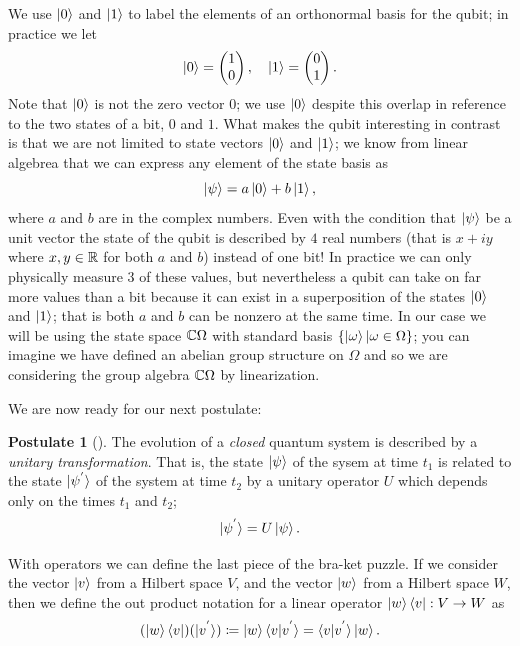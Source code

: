 \documentclass[12pt,twoside]{reedthesis}
\theoremstyle{plain}   %
\theoremstyle{definition}
\newtheorem{post}{Postulate}[section]
\theoremstyle{remark}
\numberwithin{equation}{section}
\begin{document}
   We use $\ket{0}$ and $\ket{1}$ to label the elements of an orthonormal basis for the qubit; in practice we let
   \[\ket{0} =
     \begin{pmatrix}
       1 \\
       0
     \end{pmatrix},
     \quad
     \ket{1} =
     \begin{pmatrix}
       0 \\
       1
     \end{pmatrix}.
   \]
   Note that $\ket{0}$ is not the zero vector $0$; we use $\ket{0}$ despite this overlap in reference to the two states of a bit, $0$ and $1$.
   What makes the qubit interesting in contrast is that we are not limited to state vectors $\ket{0}$ and $\ket{1}$; we know from linear algebrea that
   we can express any element of the state basis as
   \[\ket{\psi} = a \ket{0} + b \ket{1}, \]
   where $a$ and $b$ are in the complex numbers. Even with the condition that $\ket{\psi}$ be a unit vector
   the state of the qubit is described by $4$ real numbers (that is $x +iy$ where $x,y \in \mathbb{R}$ for both $a$ and $b$) instead of one bit! In practice we can only physically measure $3$ of these values,
   but nevertheless a qubit can take on far more values than a bit because it can exist in a superposition of the states $\ket{0}$ and $\ket{1}$; that is both $a$ and $b$ can be nonzero at the same time.
   In our case we will be using the state space $\mathbb{C} \Omega$ with standard basis $\{ \ket{\omega} | \omega \in \Omega\}$; you can imagine we have defined an abelian group structure on $\Omega$ and so we are
   considering the group algebra $\mathbb{C} \Omega$ by linearization. \par
   We are now ready for our next postulate:
   \begin{post}[{\cite[2.2.2]{nielsen2010}}]
     The evolution of a \emph{closed} quantum system is described by a \emph{unitary transformation}. That is, the state $\ket{\psi}$ of the sysem at time $t_1$ is related to the state
     $\ket{ \psi^{'} }$ of the system at time $t_2$ by a unitary operator $U$ which depends only on the times $t_1$ and $t_2$;
     \[ \ket{\psi^{'}} = U \ket{\psi}.\]
   \end{post}
   With operators we can define the last piece of the bra-ket puzzle. If we consider the vector $\ket{v}$ from a Hilbert space $V$, and the vector $\ket{w}$ from a Hilbert space $W$,
   then we define the out product notation for a linear operator $\ket{w} \bra{v} : V \to W$ as
   \[ (\ket{w} \bra{v}) (\ket{v^{'}}) \coloneq \ket{w} \braket{v|v^{'}} = \braket{v|v^{'}} \ket{w}.\]
\end{document}
